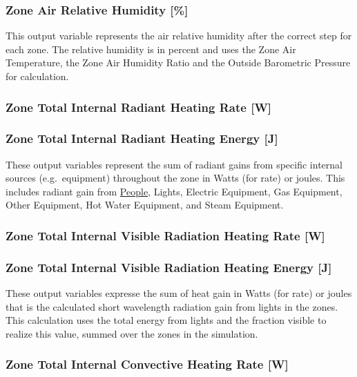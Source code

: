 \subsubsection{Zone Air Relative Humidity {[}\%{]}}\label{zone-air-relative-humidity}

This output variable represents the air relative humidity after the correct step for each zone. The relative humidity is in percent and uses the Zone Air Temperature, the Zone Air Humidity Ratio and the Outside Barometric Pressure for calculation.

\subsubsection{Zone Total Internal Radiant Heating Rate {[}W{]}}\label{zone-total-internal-radiant-heating-rate-w}

\subsubsection{Zone Total Internal Radiant Heating Energy {[}J{]}}\label{zone-total-internal-radiant-heating-energy-j}

These output variables represent the sum of radiant gains from specific internal sources (e.g.~equipment) throughout the zone in Watts (for rate) or joules. This includes radiant gain from \hyperref[people]{People}, Lights, Electric Equipment, Gas Equipment, Other Equipment, Hot Water Equipment, and Steam Equipment.

\subsubsection{Zone Total Internal Visible Radiation Heating Rate {[}W{]}}\label{zone-total-internal-visible-radiation-heating-rate-w}

\subsubsection{Zone Total Internal Visible Radiation Heating Energy {[}J{]}}\label{zone-total-internal-visible-radiation-heating-energy-j}

These output variables expresse the sum of heat gain in Watts (for rate) or joules that is the calculated short wavelength radiation gain from lights in the zones. This calculation uses the total energy from lights and the fraction visible to realize this value, summed over the zones in the simulation.

\subsubsection{Zone Total Internal Convective Heating Rate {[}W{]}}\label{zone-total-internal-convective-heating-rate-w}

